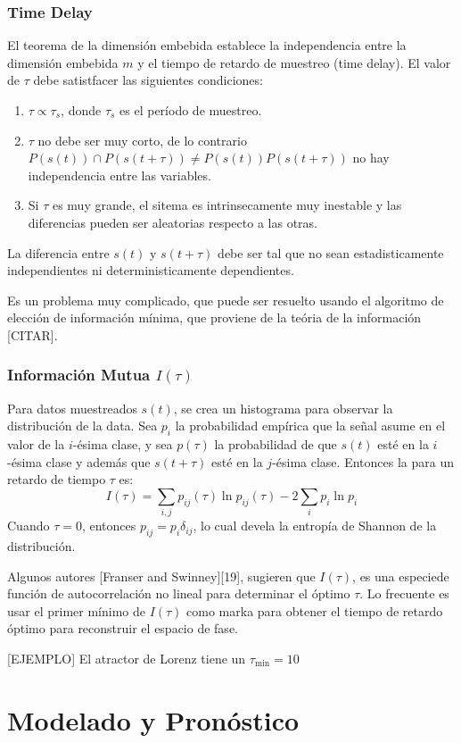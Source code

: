 \documentclass[12pt]{book}
\begin{document}
\subsubsection{Time Delay}
El teorema de la dimensión embebida establece la independencia entre la
dimensión embebida $m$ y el tiempo de retardo de muestreo (time delay). 
El valor de $\tau$ debe satistfacer las siguientes condiciones:
\begin{enumerate}
	\item $\tau \varpropto \tau_s$, donde $\tau_s$ es el período de
muestreo.
	\item $\tau$ no debe ser muy corto, de lo contrario $P(s(t)) \cap
P(s(t+\tau)) \not = P(s(t))P(s(t+\tau))$ no hay independencia entre las
variables.
	\item Si $\tau$ es muy grande, el sitema es intrinsecamente muy
inestable y las diferencias pueden ser aleatorias respecto a las otras.
\end{enumerate}

La diferencia entre $s(t)$ y $s(t+\tau)$ debe ser tal que no sean
estadisticamente independientes ni deterministicamente dependientes.

Es un problema muy complicado, que puede ser resuelto usando el algoritmo de
elección de información mínima, que proviene de la teória de la información
[CITAR].

\subsubsection{Información Mutua $I(\tau)$}
Para datos muestreados $s(t)$, se crea un histograma para observar la
distribución de la data. Sea $p_i$ la probabilidad empírica que la señal asume
en el valor de la $i$-ésima clase, y sea $p(\tau)$ la probabilidad de que
$s(t)$ esté en la $i$-ésima clase y además que $s(t+\tau)$ esté en la $j$-ésima
clase. Entonces la  para un retardo de tiempo $\tau$ es:
$$
	I(\tau) = \sum_{i,j} p_{ij}(\tau) \ln p_{ij} (\tau) - 2 \sum_i p_i \ln
p_i
$$
Cuando $\tau=0$, entonces $p_{ij} = p_i \delta_{ij}$, lo cual devela la entropía
de Shannon de la distribución. 

Algunos autores [Franser and Swinney][19], sugieren que $I(\tau)$, es una
especiede función de autocorrelación no lineal para determinar el óptimo $\tau$. 
Lo frecuente es usar el primer mínimo de $I(\tau)$ como marka para obtener el
tiempo de retardo óptimo para reconstruir el espacio de fase.

[EJEMPLO] El atractor de Lorenz tiene un $\tau_{\min}=10$



\section{Modelado y Pronóstico}
\end{document}
